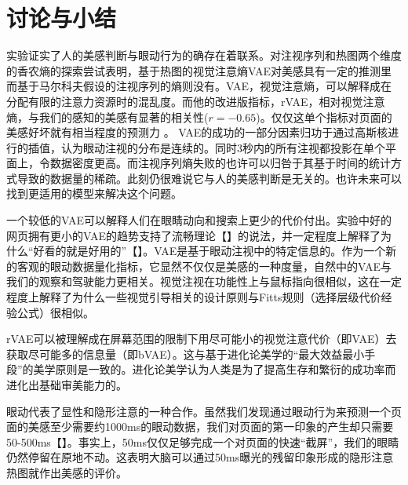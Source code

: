 \section{讨论与小结}
实验证实了人的美感判断与眼动行为的确存在着联系。对注视序列和热图两个维度的香农熵的探索尝试表明，基于热图的视觉注意熵VAE对美感具有一定的推测里而基于马尔科夫假设的注视序列的熵则没有。VAE，视觉注意熵，可以解释成在分配有限的注意力资源时的混乱度。而他的改进版指标，rVAE，相对视觉注意熵，与我们的感知的美感有显著的相关性($r = -0.65$)。仅仅这单个指标对页面的美感好坏就有相当程度的预测力
。
VAE的成功的一部分因素归功于通过高斯核进行的插值，认为眼动注视的分布是连续的。同时3秒内的所有注视都投影在单个平面上，令数据密度更高。而注视序列熵失败的也许可以归咎于其基于时间的统计方式导致的数据量的稀疏。此刻仍很难说它与人的美感判断是无关的。也许未来可以找到更适用的模型来解决这个问题。

一个较低的VAE可以解释人们在眼睛动向和搜索上更少的代价付出。实验中好的网页拥有更小的VAE的趋势支持了流畅理论【】的说法，并一定程度上解释了为什么“好看的就是好用的”【】。VAE是基于眼动注视中的特定信息的。作为一个新的客观的眼动数据量化指标，它显然不仅仅是美感的一种度量，自然中的VAE与我们的观察和驾驶能力更相关。视觉注视在功能性上与鼠标指向很相似，这在一定程度上解释了为什么一些视觉引导相关的设计原则与Fitts规则（选择层级代价经验公式）很相似。

rVAE可以被理解成在屏幕范围的限制下用尽可能小的视觉注意代价（即VAE）去获取尽可能多的信息量（即bVAE）。这与基于进化论美学的“最大效益最小手段”的美学原则是一致的。进化论美学认为人类是为了提高生存和繁衍的成功率而进化出基础审美能力的。

眼动代表了显性和隐形注意的一种合作。虽然我们发现通过眼动行为来预测一个页面的美感至少需要约1000ms的眼动数据，我们对页面的第一印象的产生却只需要50-500ms【】。事实上，50ms仅仅足够完成一个对页面的快速“截屏”，我们的眼睛仍然停留在原地不动。这表明大脑可以通过50ms曝光的残留印象形成的隐形注意热图就作出美感的评价。
